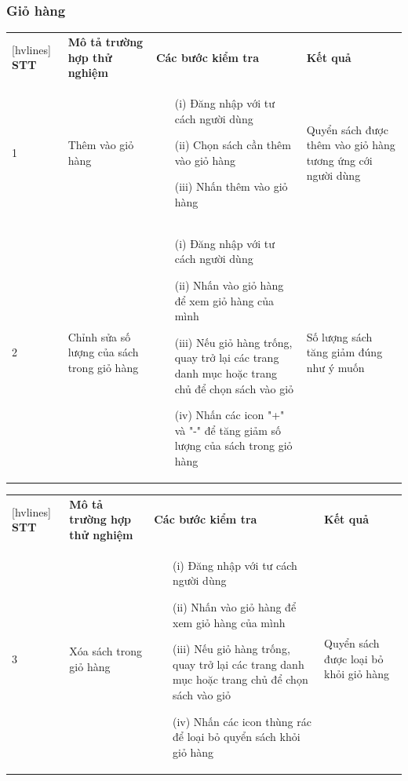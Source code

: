 \documentclass[../DoAn.tex]{subfiles}
\begin{document}
\subsubsection{Giỏ hàng}
\begin{NiceTabular}[width=1\linewidth]{X[1,l]X[2,l]X[5,l]X[3,l]}[hvlines]
\textbf{STT} & \textbf{Mô tả trường hợp thử nghiệm} & \textbf{Các bước kiểm tra} & \textbf{Kết quả} \\
1 & Thêm vào giỏ hàng & \begin{enumerate}
                        \item[(i)] Đăng nhập với tư cách người dùng
                        \item[(ii)] Chọn sách cần thêm vào giỏ hàng
                        \item[(iii)] Nhấn thêm vào giỏ hàng 
                        \end{enumerate}
& Quyển sách được thêm vào giỏ hàng tương ứng cới người dùng \\
2 & Chỉnh sửa số lượng của sách trong giỏ hàng
& \begin{enumerate}
    \item[(i)] Đăng nhập với tư cách người dùng
    \item[(ii)] Nhấn vào giỏ hàng để xem giỏ hàng của mình
    \item[(iii)] Nếu giỏ hàng trống, quay trở lại các trang danh mục hoặc
    trang chủ để chọn sách vào giỏ
    \item[(iv)] Nhấn các icon "+" và "-" để tăng giảm số lượng của sách trong giỏ hàng
\end{enumerate}
& Số lượng sách tăng giảm đúng như  ý muốn \\
\end{NiceTabular}

\begin{NiceTabular}[width=1\linewidth]{X[1,l]X[2,l]X[5,l]X[3,l]}[hvlines]
\textbf{STT} & \textbf{Mô tả trường hợp thử nghiệm} & \textbf{Các bước kiểm tra} & \textbf{Kết quả} \\
3 & Xóa sách trong giỏ hàng
& \begin{enumerate}
    \item[(i)] Đăng nhập với tư cách người dùng
    \item[(ii)] Nhấn vào giỏ hàng để xem giỏ hàng của mình
    \item[(iii)] Nếu giỏ hàng trống, quay trở lại các trang danh mục hoặc
    trang chủ để chọn sách vào giỏ
    \item[(iv)] Nhấn các icon thùng rác để loại bỏ quyển sách khỏi giỏ hàng
\end{enumerate}
 & Quyển sách được loại bỏ khỏi giỏ hàng  \\   
\end{NiceTabular}
\end{document}
